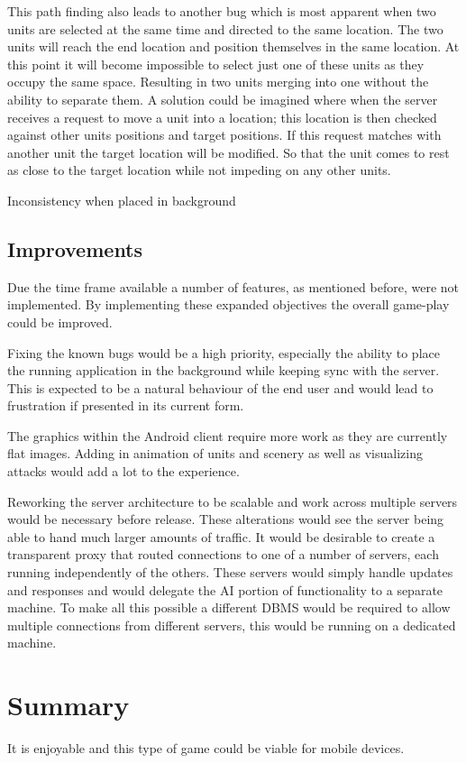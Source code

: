 This path finding also leads to another bug which is most apparent when two units are selected at the same time and directed to the same location. The two units will reach the end location and position themselves in the same location. At this point it will become impossible to select just one of these units as they occupy the same space. Resulting in two units merging into one without the ability to separate them. A solution could be imagined where when the server receives a request to move a unit into a location; this location is then checked against other units positions and target positions. If this request matches with another unit the target location will be modified. So that the unit comes to rest as close to the target location while not impeding on any other units.


Inconsistency when placed in background

\subsection{Improvements}
Due the time frame available a number of features, as mentioned before, were not implemented. By implementing these expanded objectives the overall game-play could be improved.

Fixing the known bugs would be a high priority, especially the ability to place the running application in the background while keeping sync with the server. This is expected to be a natural behaviour of the end user and would lead to frustration if presented in its current form.

The graphics within the Android client require more work as they are currently flat images. Adding in animation of units and scenery as well as visualizing attacks would add a lot to the experience.

Reworking the server architecture to be scalable and work across multiple servers would be necessary before release. These alterations would see the server being able to hand much larger amounts of traffic. It would be desirable to create a transparent proxy that routed connections to one of a number of servers, each running independently of the others. These servers would simply handle updates and responses and would delegate the AI portion of functionality to a separate machine. To make all this possible a different DBMS would be required to allow multiple connections from different servers, this would be running on a dedicated machine.


\section{Summary}
It is enjoyable and this type of game could be viable for mobile devices.

